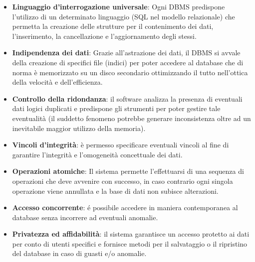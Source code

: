 \begin{itemize}
    \item \textbf{Linguaggio d'interrogazione universale}: Ogni DBMS predispone l'utilizzo di un determinato linguaggio (SQL nel modello relazionale) che permetta la creazione delle strutture per il contenimento dei dati, l'inserimento, la cancellazione e l'aggiornamento degli stessi.
    \item \textbf{Indipendenza dei dati}: Grazie all'astrazione dei dati, il DBMS si avvale della creazione di specifici file (indici) per poter accedere al database che di norma è memorizzato su un disco secondario ottimizzando il tutto nell'ottica della velocità e dell'efficienza.
    \item \textbf{Controllo della ridondanza}: il software analizza la presenza di eventuali dati logici duplicati e predispone gli strumenti per poter gestire tale eventualità (il suddetto fenomeno potrebbe generare inconsistenza oltre ad un inevitabile maggior utilizzo della memoria).
    \item \textbf{Vincoli d'integrità}: è permesso specificare eventuali vincoli al fine di garantire l'integrità e l'omogeneità concettuale dei dati.
    \item \textbf{Operazioni atomiche}: Il sistema permette l'effettuarsi di una sequenza di operazioni che deve avvenire con successo, in caso contrario ogni singola operazione viene annullata e la base di dati non subisce alterazioni.
    \item \textbf{Accesso concorrente}: é possibile accedere in maniera contemporanea al database senza incorrere ad eventuali anomalie.
    \item \textbf{Privatezza ed affidabilità}: il sistema garantisce un accesso protetto ai dati per conto di utenti specifici e fornisce metodi per il salvataggio o il ripristino del database in caso di guasti e/o anomalie.
\end{itemize}

\clearpage

